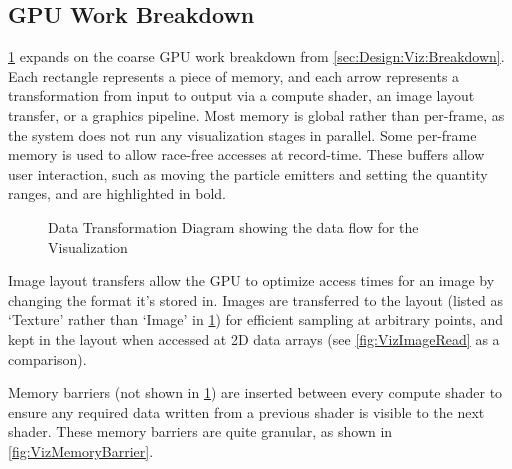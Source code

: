 \subsection{GPU Work Breakdown}
\cref{fig:VizDataTransform} expands on the coarse GPU work breakdown from \cref{sec:Design:Viz:Breakdown}.
Each rectangle represents a piece of memory, and each arrow represents a transformation from input to output via a compute shader, an image layout transfer, or a graphics pipeline.
Most memory is global rather than per-frame, as the system does not run any visualization stages in parallel.
Some per-frame memory is used to allow race-free accesses at record-time.
These buffers allow user interaction, such as moving the particle emitters and setting the quantity ranges, and are highlighted in bold.
\pagebreak
{}
\begin{figure}
    \centering
    \caption{Data Transformation Diagram showing the data flow for the Visualization}
    \label{fig:VizDataTransform}
\end{figure}
\restoregeometry
\pagebreak

Image layout transfers allow the GPU to optimize access times for an image by changing the format it's stored in.
Images are transferred to the  layout (listed as `Texture' rather than `Image' in \cref{fig:VizDataTransform}) for efficient sampling at arbitrary points, and kept in the  layout when accessed at 2D data arrays (see \cref{fig:VizImageRead} as a comparison).

Memory barriers (not shown in \cref{fig:VizDataTransform}) are inserted between every compute shader to ensure any required data written from a previous shader is visible to the next shader\cite{TheKhronosGroupVulkanSpec}. %
These memory barriers are quite granular, as shown in \cref{fig:VizMemoryBarrier}.

